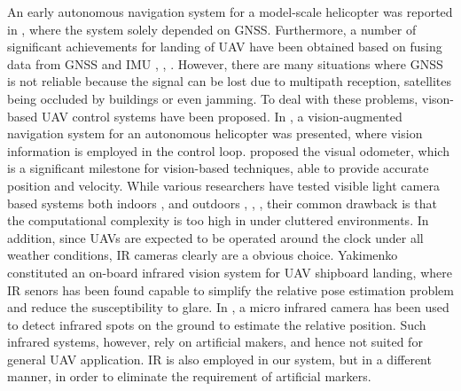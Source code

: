 \documentclass[letterpaper, 10 pt, conference]{ieeeconf}  %
\begin{document}
An early autonomous navigation system for a model-scale helicopter was reported in \cite{Conway:1995}, where the system solely depended on GNSS. Furthermore, a number of significant achievements for landing of UAV have been obtained based on fusing data from GNSS and IMU  \cite{Templeton2007}, \cite{He2010}, \cite{Scherer2008}. However, there are many situations where GNSS is not reliable because the signal can be lost due to multipath reception, satellites being occluded by buildings or even jamming. To deal with these problems, vison-based UAV control systems have been proposed. In \cite{bosse1997vision}, a vision-augmented navigation system for an autonomous helicopter was presented, where vision information is employed in the control loop. \cite{Amidi1999} proposed the visual odometer, which is a significant milestone for vision-based techniques, able to provide accurate position and velocity. While various researchers have tested visible light 
camera based systems both indoors \cite{MATSUE2005}, \cite{Bouabdallah2005} and outdoors \cite{Saripalli2003a}, \cite{1331783}, \cite{Saripalli2003}, their common drawback is that the computational complexity is too high in under cluttered environments. In addition, since UAVs are expected to be operated around the clock under all weather conditions, IR cameras clearly are a obvious choice. Yakimenko \cite{Yakimenko2002} constituted an on-board infrared vision system for UAV shipboard landing, where IR senors has been found capable to simplify the relative pose estimation problem and reduce the susceptibility to glare. In \cite{Wenzel2010}, a micro infrared camera has been used to detect infrared spots on the ground to estimate the relative position. Such infrared systems, however, rely on artificial makers, and hence not suited for general UAV application. IR is also employed in our system, but in a different manner, in order to eliminate the requirement of artificial markers.
\end{document}
